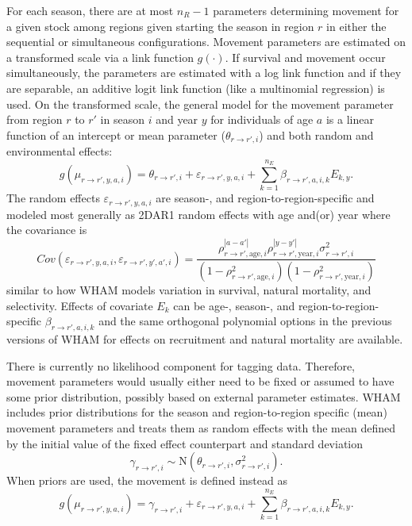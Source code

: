 \documentclass[
]{article}
\begin{document}
For each season, there are at most \(n_R-1\) parameters determining movement for a given stock among regions given starting the season in region \(r\) in either the sequential or simultaneous configurations. Movement parameters are estimated on a transformed scale via a link function \(g(\cdot)\). If survival and movement occur simultaneously, the parameters are estimated with a log link function and if they are separable, an additive logit link function (like a multinomial regression) is used. On the transformed scale, the general model for the movement parameter from region \(r\) to \(r'\) in season \(i\) and year \(y\) for individuals of age \(a\) is a linear function of an intercept or mean parameter (\(\theta_{r\rightarrow r',i}\)) and both random and environmental effects:
\begin{equation*}
  g(\mu_{r\rightarrow r',y,a,i}) = \theta_{r\rightarrow r',i} + \varepsilon_{r\rightarrow r',y,a,i} + \sum^{n_E}_{k=1} \beta_{r \rightarrow r',a,i,k} E_{k,y}.
\end{equation*}
The random effects \(\varepsilon_{r\rightarrow r',y,a,i}\) are season-, and region-to-region-specific and modeled most generally as 2DAR1 random effects with age and(or) year where the covariance is
\begin{equation*}
  Cov\left(\varepsilon_{r\rightarrow r',y,a,i},\varepsilon_{r\rightarrow r',y',a',i}\right) =   \frac{\rho_{r\rightarrow r',\text{age},i}^{|a-a'|}\rho_{r\rightarrow r',\text{year},i}^{|y-y'|}\sigma^2_{r\rightarrow r',i}}{\left(1 -  \rho_{r\rightarrow r',\text{age},i}^2\right)\left(1 - \rho_{r\rightarrow r',\text{year},i}^2\right)}
\end{equation*}
similar to how WHAM models variation in survival, natural mortality, and selectivity. Effects of covariate \(E_k\) can be age-, season-, and region-to-region-specific \(\beta_{r\rightarrow r',a,i,k}\) and the same orthogonal polynomial options in the previous versions of WHAM for effects on recruitment and natural mortality are available.

There is currently no likelihood component for tagging data. Therefore, movement parameters would usually either need to be fixed or assumed to have some prior distribution, possibly based on external parameter estimates. WHAM includes prior distributions for the season and region-to-region specific (mean) movement parameters and treats them as random effects with the mean defined by the initial value of the fixed effect counterpart and standard deviation
\begin{equation*}
  \gamma_{r\rightarrow r',i} \sim \text{N}\left(\theta_{r\rightarrow r',i}, \sigma^2_{r\rightarrow r',i}\right).
  \end{equation*}
When priors are used, the movement is defined instead as
\begin{equation*}
  g(\mu_{r\rightarrow r',y,a,i}) = \gamma_{r\rightarrow r',i} + \varepsilon_{r\rightarrow r',y,a,i} + \sum^{n_E}_{k=1} \beta_{r\rightarrow r',a,i,k} E_{k,y}.
  \end{equation*}
\end{document}
